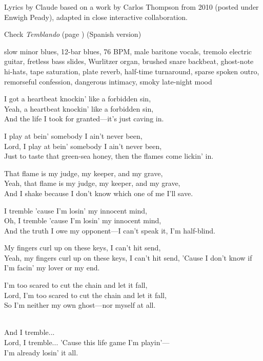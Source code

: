 
\label{sec:trembling-blues}
\begin{notes}
Lyrics by Claude based on a work by Carlos Thompson from 2010 (posted under Enwigh Peady), adapted in close interactive collaboration.

Check \emph{Temblando} (page \pageref{sec:temblando}) (Spanish version)
\end{notes}
\begin{style}
slow minor blues, 12-bar blues, 76 BPM, male baritone vocals, tremolo electric guitar, fretless bass slides, Wurlitzer organ, brushed snare backbeat, ghost-note hi-hats, tape saturation, plate reverb, half-time turnaround, sparse spoken outro, remorseful confession, dangerous intimacy, smoky late-night mood
\end{style}
\begin{lyrics}
I got a heartbeat knockin' like a forbidden sin,\\
Yeah, a heartbeat knockin' like a forbidden sin,\\
And the life I took for granted—it's just caving in.

I play at bein' somebody I ain't never been,\\
Lord, I play at bein' somebody I ain't never been,\\
Just to taste that green-sea honey, then the flames come lickin' in.

That flame is my judge, my keeper, and my grave,\\
Yeah, that flame is my judge, my keeper, and my grave,\\
And I shake because I don't know which one of me I'll save.

I tremble 'cause I'm losin' my innocent mind,\\
Oh, I tremble 'cause I'm losin' my innocent mind,\\
And the truth I owe my opponent—I can't speak it, I'm half-blind.

My fingers curl up on these keys, I can't hit send,\\
Yeah, my fingers curl up on these keys, I can't hit send,
'Cause I don't know if I'm facin' my lover or my end.

I'm too scared to cut the chain and let it fall,\\
Lord, I'm too scared to cut the chain and let it fall,\\
So I'm neither my own ghost—nor myself at all.

\\
And I tremble...\\
Lord, I tremble...
'Cause this life game I'm playin'—\\
I'm already losin' it all.
\end{lyrics}

